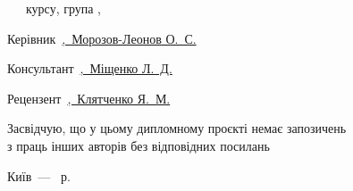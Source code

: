 \noindent \theWordDone\ \theStudent\ \theSYear\ курсу, група \theGroup,\\
\underline{\thesisAuthor}\hfill\titleSig\par

\vspace{2mm}
\noindent Керівник\ \underline{\supervisorRegalia,\ Морозов-Леонов О.~С.}\hfill\titleSig\par

\vspace{2mm}
\noindent Консультант\ \underline{\consultantRegalia,\ Міщенко Л.~Д.}\hfill\titleSig\par

\vspace{2mm}
\noindent Рецензент\ \underline{\visorRegalia,\ Клятченко Я.~М.}\hfill\titleSig\par

\vspace{4mm}
\begin{flushright}
Засвідчую, що у цьому дипломному проєкті немає запозичень \\ з праць інших авторів без відповідних посилань

\begin{flushright}
\underline{\hspace{0.26\textwidth}} \; \textbf{\thesisAuthorInitials}
\end{flushright}%
\end{flushright}

\vspace{0pt plus5fill}
\begin{center}%
{Київ~--- \the\year\ р.}
\end{center}%
\newpage
